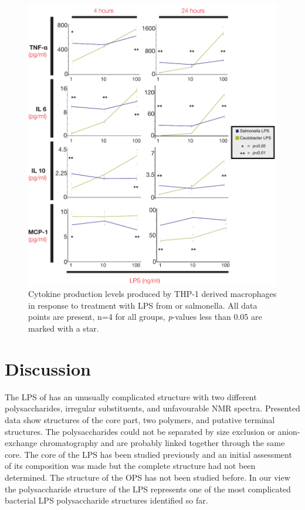 \begin{figure}[p]
  \begin{center}
   \includegraphics[width=\textwidth]{lps_chapter/img/cytokineprofile.pdf}
  \end{center}
  \caption[Cytokine profile comparing \caulobacter{} and \ac{salmonella} \ac{LPS}]{
    Cytokine production levels produced by THP-1 derived macrophages in response to treatment with \ac{LPS} from \caulobacter{} or \ac{salmonella}.  All data points are present, n=4 for all groups, \textit{p}-values less than 0.05 are marked with a star.
  }
  \label{fig:cytokineprofile}
\end{figure}    

\section{Discussion} %
\label{sec:lps_discussion}

The \ac{LPS} of \caulobacter has an unusually complicated structure with two different
polysaccharides, irregular substituents, and unfavourable \ac{NMR} spectra. Presented data show
structures of the core part, two polymers, and putative terminal structures. The polysaccharides
could not be separated by size exclusion or anion-exchange chromatography and are probably linked
together through the same core. The core of the \caulobacter{} \ac{LPS} has been studied previously
and an initial assessment of its composition was made but the complete
structure had not been determined. The structure of the \ac{OPS} has not been studied before. In our
view the polysaccharide structure of the \caulobacter{} \ac{LPS} represents one of the most
complicated bacterial \ac{LPS} polysaccharide structures identified so far.

